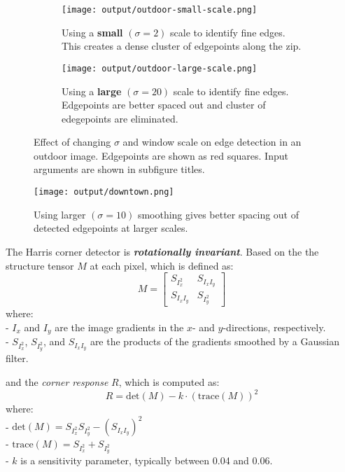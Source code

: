 \documentclass[12pt]{report}
\begin{document}
\begin{enumerate}
    \begin{figure}[!ht]\centering
        \hspace*{-0.8in}
        \begin{subfigure}{0.45\textwidth}
            \texttt{[image: output/outdoor-small-scale.png]}
            \caption{Using a \textbf{small} $(\sigma=2)$ scale to identify fine edges. This creates a dense cluster of edgepoints along the zip.}
            \label{fig:Figure23a}
        \end{subfigure}
    \hfil
        \begin{subfigure}{0.45\textwidth}
        \texttt{[image: output/outdoor-large-scale.png]}
        \caption{Using a \textbf{large} $(\sigma=20)$ scale to identify fine edges. Edgepoints are better spaced out and cluster of edegepoints are eliminated.}
        \label{fig:Figure23b}
        \end{subfigure}
        \caption{Effect of changing $\sigma$ and window scale on edge detection in an outdoor image. Edgepoints are shown as red squares. Input arguments are shown in 
        subfigure titles.}
        \label{fig:Figure23}
    \end{figure}

    \begin{figure}[H]
        \centering
        \texttt{[image: output/downtown.png]}
        \caption{Using larger $(\sigma=10)$ smoothing gives better spacing out of detected edgepoints at larger scales.}
        \label{fig:Figure24}
    \end{figure}

    The Harris corner detector is \textit{\textbf{rotationally invariant}}. Based on the the structure tensor \( M \) at each pixel, which is defined as:
    \[
    M = \begin{bmatrix}
    S_{I_x^2} & S_{I_x I_y} \\
    S_{I_x I_y} & S_{I_y^2}
    \end{bmatrix}
    \]
    where:\\
    - \( I_x \) and \( I_y \) are the image gradients in the \( x \)- and \( y \)-directions, respectively. \\
    - \( S_{I_x^2} \), \( S_{I_y^2} \), and \( S_{I_x I_y} \) are the products of the gradients smoothed by a Gaussian filter.  

    and the \textit{corner response} \( R \), which is computed as:
    \[
    R = \text{det}(M) - k \cdot (\text{trace}(M))^2
    \]
    where: \\
    - \( \text{det}(M) = S_{I_x^2} S_{I_y^2} - (S_{I_x I_y})^2 \) \\
    - \( \text{trace}(M) = S_{I_x^2} + S_{I_y^2} \) \\
    - \( k \) is a sensitivity parameter, typically between 0.04 and 0.06.  
    

\end{enumerate}
\end{document}
